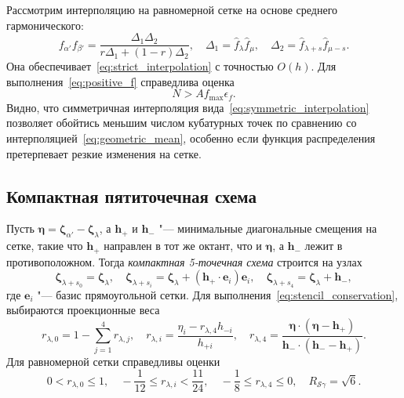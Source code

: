 \documentclass[a4paper,12pt]{article}
\newcommand{\bzeta}{\boldsymbol{\zeta}}
\newcommand{\bh}{\boldsymbol{h}}
\newcommand{\be}{\boldsymbol{e}}
\newcommand{\OO}[1]{O(#1)}
\begin{document}
Рассмотрим интерполяцию на равномерной сетке на основе среднего гармонического:
\begin{equation}\label{eq:symmetric_interpolation}
    f_{\alpha'}f_{\beta'} = \frac{\Delta_1\Delta_2}{r\Delta_1+(1-r)\Delta_2}, \quad
    \Delta_1 = \hat{f}_\lambda \hat{f}_\mu, \quad
    \Delta_2 = \hat{f}_{\lambda+s}\hat{f}_{\mu-s}.
\end{equation}
Она обеспечивает~\eqref{eq:strict_interpolation} с точностью \(\OO{h}\).
Для выполнения~\eqref{eq:positive_f} справедлива оценка
\begin{equation}\label{eq:positive_f_symmetric}
    N > A f_{\max} \epsilon_f.
\end{equation}
Видно, что симметричная интерполяция вида~\eqref{eq:symmetric_interpolation} позволяет обойтись
меньшим числом кубатурных точек по сравнению со интерполяцией~\eqref{eq:geometric_mean},
особенно если функция распределения претерпевает резкие изменения на сетке.

\subsection{Компактная пятиточечная схема}

Пусть \(\boldsymbol{\eta} = \bzeta_{\alpha'} - \bzeta_{\lambda}\),
а \(\bh_+\) и \(\bh_-\) "--- минимальные диагональные смещения на сетке,
такие что \(\bh_+\) направлен в тот же октант, что и \(\boldsymbol{\eta}\),
а \(\bh_-\) лежит в противоположном.
Тогда \emph{компактная 5-точечная схема} строится на узлах
\begin{equation}\label{eq:stencil_nodes5}
    \bzeta_{\lambda+s_0} = \bzeta_{\lambda}, \quad
    \bzeta_{\lambda+s_i} = \bzeta_{\lambda} + (\bh_+\cdot \be_i)\be_i, \quad
    \bzeta_{\lambda+s_4} = \bzeta_{\lambda} + \bh_-,
\end{equation}
где \(\be_i\) "--- базис прямоугольной сетки.
Для выполнения~\eqref{eq:stencil_conservation}, выбираются проекционные веса
\begin{equation}\label{eq:stencil_weights5}
    r_{\lambda,0} = 1 - \sum_{j=1}^4 r_{\lambda,j}, \quad
    r_{\lambda,i} = \frac{\eta_i - r_{\lambda,4}h_{-i}}{h_{+i}}, \quad
    r_{\lambda,4} = \frac{\boldsymbol{\eta}\cdot(\boldsymbol{\eta} - \bh_+)}
        {\bh_-\cdot(\bh_- - \bh_+)}.
\end{equation}
Для равномерной сетки справедливы оценки
\begin{equation}\label{eq:weights_ranges5}
    0 < r_{\lambda,0} \leq 1, \quad
    -\frac1{12} \leq r_{\lambda,i} < \frac{11}{24}, \quad
    -\frac18 \leq r_{\lambda,4} \leq 0, \quad
    R_{\mathcal{S}\gamma} = \sqrt{6}.
\end{equation}
\end{document}
